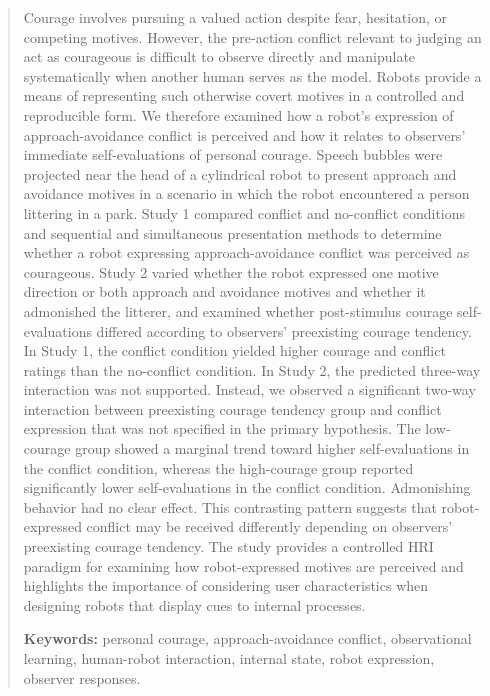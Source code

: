 \documentclass[utf8]{FrontiersinHarvard}
\begin{document}
\begin{abstract}
Courage involves pursuing a valued action despite fear, hesitation, or competing motives. However, the pre-action conflict relevant to judging an act as courageous is difficult to observe directly and manipulate systematically when another human serves as the model. Robots provide a means of representing such otherwise covert motives in a controlled and reproducible form. We therefore examined how a robot's expression of approach-avoidance conflict is perceived and how it relates to observers' immediate self-evaluations of personal courage. Speech bubbles were projected near the head of a cylindrical robot to present approach and avoidance motives in a scenario in which the robot encountered a person littering in a park. Study 1 compared conflict and no-conflict conditions and sequential and simultaneous presentation methods to determine whether a robot expressing approach-avoidance conflict was perceived as courageous. Study 2 varied whether the robot expressed one motive direction or both approach and avoidance motives and whether it admonished the litterer, and examined whether post-stimulus courage self-evaluations differed according to observers' preexisting courage tendency. In Study 1, the conflict condition yielded higher courage and conflict ratings than the no-conflict condition. In Study 2, the predicted three-way interaction was not supported. Instead, we observed a significant two-way interaction between preexisting courage tendency group and conflict expression that was not specified in the primary hypothesis. The low-courage group showed a marginal trend toward higher self-evaluations in the conflict condition, whereas the high-courage group reported significantly lower self-evaluations in the conflict condition. Admonishing behavior had no clear effect. This contrasting pattern suggests that robot-expressed conflict may be received differently depending on observers' preexisting courage tendency. The study provides a controlled HRI paradigm for examining how robot-expressed motives are perceived and highlights the importance of considering user characteristics when designing robots that display cues to internal processes.

{\fontsize{8}{11}\selectfont\sloppy\noindent\textbf{Keywords:} personal courage, approach-avoidance conflict, observational learning, human-robot interaction, internal state, robot expression, observer responses.\par}
\end{abstract}
\end{document}
